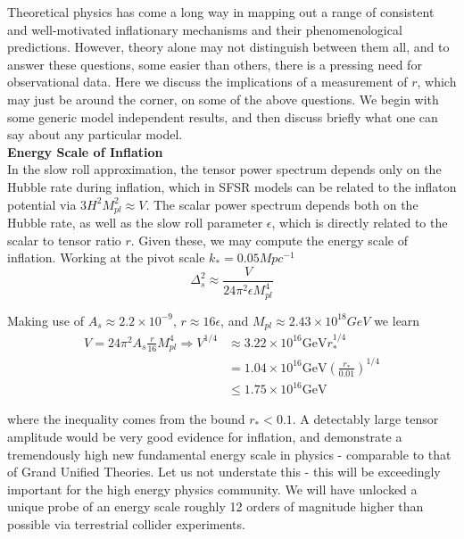 \documentclass[a4paper,10pt]{article}
\newcommand{\Mp}{M_{pl}}
\begin{document}
Theoretical physics has come a long way in mapping out a range of consistent and well-motivated inflationary mechanisms and their phenomenological predictions. However, theory alone may not distinguish between them all, and to answer these questions, some easier than others, there is a pressing need for observational data. Here we discuss the implications of a measurement of $r$, which may just be around the corner, on some of the above questions. We begin with some generic model independent results, and then discuss briefly what one can say about any particular model.\\

\textbf{Energy Scale of Inflation} \\

In the slow roll approximation, the tensor power spectrum depends only on the Hubble rate during inflation, which in SFSR models can be related to the inflaton potential via $3H^2\Mp^2\approx V$. The scalar power spectrum depends both on the Hubble rate, as well as the slow roll parameter $\epsilon$, which is directly related to the scalar to tensor ratio $r$. Given these, we may compute the energy scale of inflation. Working at the pivot scale $k_* = 0.05Mpc^{-1}$
\begin{equation}
\Delta^2_{s}\approx \frac{V}{24\pi^2\epsilon\Mp^4}
\end{equation}

Making use of $ A_s \approx 2.2\times10^{-9}$, $r\approx 16\epsilon$, and $\Mp \approx 2.43\times 10^{18} GeV$ we learn
\begin{equation}\begin{split}
V=24\pi^2A_s\frac{r}{16}\Mp^4 \Rightarrow V^{1/4} &\approx 3.22\times10^{16}\text{GeV}r_*^{1/4}\\
&= 1.04\times10^{16}\text{GeV}(\frac{r_*}{0.01})^{1/4} \\
&\leq 1.75\times10^{16}\text{GeV}
\end{split}\end{equation}

where the inequality comes from the  bound $r_*<0.1$. A detectably large tensor amplitude would be very good evidence for inflation, and demonstrate a tremendously high new fundamental energy scale in physics - comparable to that of Grand Unified Theories. Let us not understate this - this will be exceedingly important for the high energy physics community. We will have unlocked a unique probe of an energy scale roughly 12 orders of magnitude higher than possible via terrestrial collider experiments. \\
\end{document}
